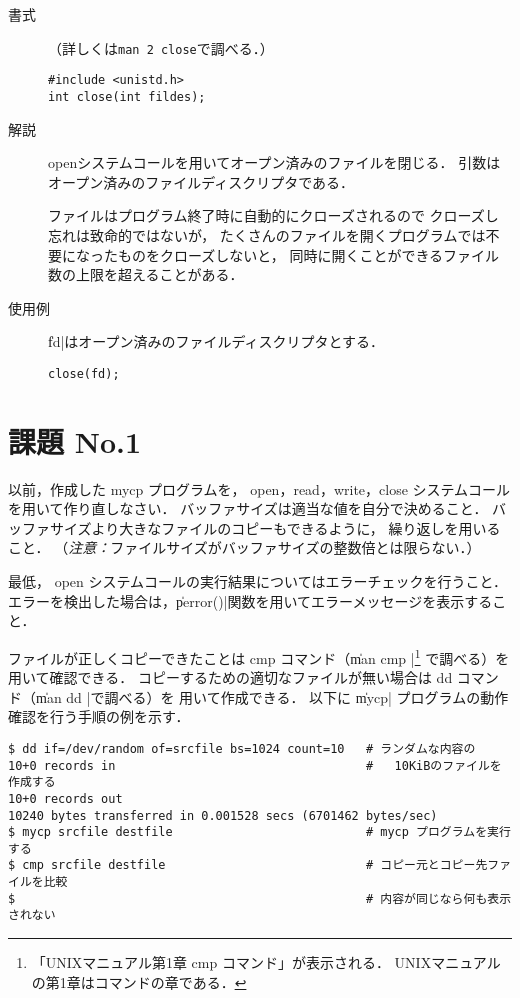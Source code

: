 \begin{description}
\item[書式]（詳しくは\texttt{man 2 close}で調べる．）

\begin{lstlisting}[numbers=none]
#include <unistd.h>
int close(int fildes);
\end{lstlisting}

\item[解説]
openシステムコールを用いてオープン済みのファイルを閉じる．
引数はオープン済みのファイルディスクリプタである．

ファイルはプログラム終了時に自動的にクローズされるので
クローズし忘れは致命的ではないが，
たくさんのファイルを開くプログラムでは不要になったものをクローズしないと，
同時に開くことができるファイル数の上限を超えることがある．

\item[使用例]
\|fd|はオープン済みのファイルディスクリプタとする．

\begin{lstlisting}[numbers=none]
close(fd);
\end{lstlisting}
\end{description}

\section*{課題 No.1}
以前，作成した mycp プログラムを，
open，read，write，close システムコールを用いて作り直しなさい．
バッファサイズは適当な値を自分で決めること．
バッファサイズより大きなファイルのコピーもできるように，
繰り返しを用いること．
（\emph{注意：}ファイルサイズがバッファサイズの整数倍とは限らない．）

最低，
open システムコールの実行結果についてはエラーチェックを行うこと．
エラーを検出した場合は，\|perror()|関数を用いてエラーメッセージを表示すること．

ファイルが正しくコピーできたことは cmp コマンド（\| man cmp |\footnote{
「UNIXマニュアル第1章 cmp コマンド」が表示される．
UNIXマニュアルの第1章はコマンドの章である．} で調べる）を
用いて確認できる．
コピーするための適切なファイルが無い場合は dd コマンド（\| man dd |で調べる）を
用いて作成できる．
以下に \|mycp| プログラムの動作確認を行う手順の例を示す．

\begin{lstlisting}[numbers=none]
$ dd if=/dev/random of=srcfile bs=1024 count=10   # ランダムな内容の
10+0 records in                                   #   10KiBのファイルを作成する
10+0 records out
10240 bytes transferred in 0.001528 secs (6701462 bytes/sec)
$ mycp srcfile destfile                           # mycp プログラムを実行する
$ cmp srcfile destfile                            # コピー元とコピー先ファイルを比較
$                                                 # 内容が同じなら何も表示されない
\end{lstlisting}

